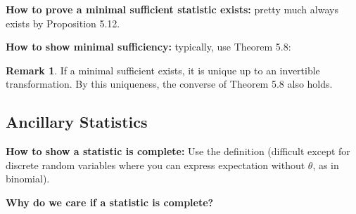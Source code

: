 \documentclass{article}
\theoremstyle{definition}
\newtheorem{theorem}{Theorem}
\theoremstyle{definition}
\theoremstyle{definition}
\theoremstyle{definition}
\theoremstyle{definition}
\newtheorem*{remark}{Remark}
\theoremstyle{definition}
\theoremstyle{definition}
\begin{document}
\textbf{How to prove a minimal sufficient statistic exists:} pretty much always exists by Proposition 5.12.

\textbf{How to show minimal sufficiency:} typically, use Theorem 5.8:

\noindent{}

\begin{remark}If a minimal sufficient exists, it is unique up to an invertible transformation. By this uniqueness, the converse of Theorem 5.8 also holds.

\end{remark}

\subsection{Ancillary Statistics}

\textbf{How to show a statistic is complete:} Use the definition (difficult except for discrete random variables where you can express expectation without \(\theta\), as in binomial).

\textbf{Why do we care if a statistic is complete?}
\end{document}
